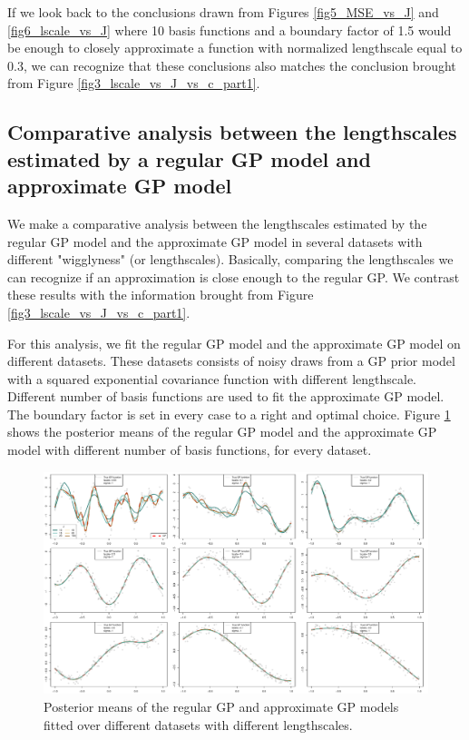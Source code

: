 \documentclass[]{interact}
\theoremstyle{plain}%
\theoremstyle{definition}
\theoremstyle{remark}
\begin{document}
If we look back to the conclusions drawn from Figures \ref{fig5_MSE_vs_J} and \ref{fig6_lscale_vs_J} where 10 basis functions and a boundary factor of 1.5 would be enough to closely approximate a function with normalized lengthscale equal to 0.3, we can recognize that these conclusions also matches the conclusion brought from Figure \ref{fig3_lscale_vs_J_vs_c_part1}.

\subsection{Comparative analysis between the lengthscales estimated by a regular GP model and approximate GP model}

We make a comparative analysis between the lengthscales estimated by the regular GP model and the approximate GP model in several datasets with different "wigglyness" (or lengthscales). Basically, comparing the lengthscales we can recognize if an approximation is close enough to the regular GP. We contrast these results with the information brought from Figure \ref{fig3_lscale_vs_J_vs_c_part1}.

For this analysis, we fit the regular GP model and the approximate GP model on different datasets. These datasets consists of noisy draws from a GP prior model with a squared exponential covariance function with different lengthscale. Different number of basis functions are used to fit the approximate GP model. The boundary factor is set in every case to a right and optimal choice. Figure \ref{fig7_varing_lscale} shows the posterior means of the regular GP model and the approximate GP model with different number of basis functions, for every dataset.

\begin{figure}
\centering
\includegraphics[width=\textwidth]{fig7_varing_lscale.pdf}
\caption{Posterior means of the regular GP and approximate GP models fitted over different datasets with different lengthscales.}
  \label{fig7_varing_lscale}
\end{figure}
\end{document}
